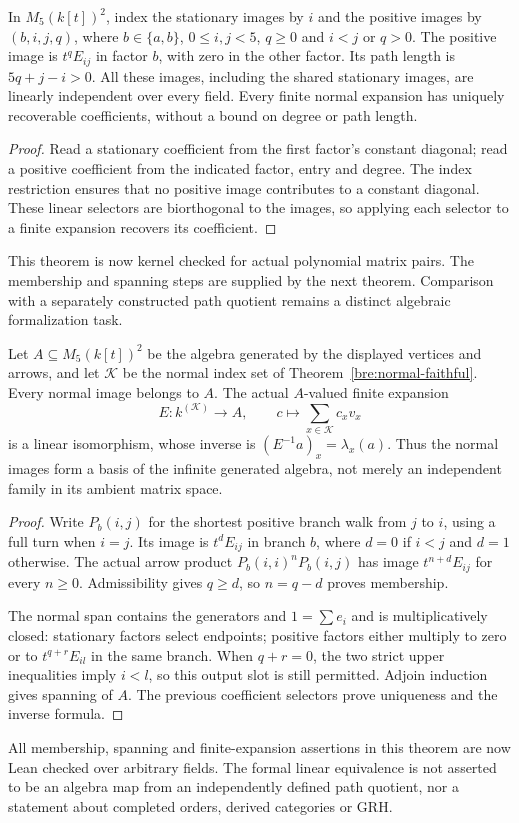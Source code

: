 \begin{theorem}\label{bre:normal-faithful}
In $M_5(k[t])^2$, index the stationary images by $i$ and the positive
images by $(b,i,j,q)$, where $b\in\{a,b\}$, $0\leq i,j<5$, $q\geq0$
and $i<j$ or $q>0$. The positive image is $t^qE_{ij}$ in factor $b$,
with zero in the other factor. Its path length is $5q+j-i>0$.
All these images, including the shared stationary images, are linearly
independent over every field. Every finite normal expansion has uniquely
recoverable coefficients, without a bound on degree or path length.
\end{theorem}
\begin{proof}
Read a stationary coefficient from the first factor's constant diagonal;
read a positive coefficient from the indicated factor, entry and degree.
The index restriction ensures that no positive image contributes to a
constant diagonal. These linear selectors are biorthogonal to the images,
so applying each selector to a finite expansion recovers its coefficient.
\end{proof}
This theorem is now kernel checked for actual polynomial matrix pairs.
The membership and spanning steps are supplied by the next theorem.
Comparison with a separately constructed path quotient remains a distinct
algebraic formalization task.


\begin{theorem}\label{bre:normal-generated}
Let $A\subseteq M_5(k[t])^2$ be the algebra generated by the displayed
vertices and arrows, and let $\mathcal K$ be the normal index set of
Theorem~\ref{bre:normal-faithful}. Every normal image belongs to $A$.
The actual $A$-valued finite expansion
\[
 E:k^{(\mathcal K)}\longrightarrow A,\qquad
 c\longmapsto\sum_{x\in\mathcal K}c_xv_x
\]
is a linear isomorphism, whose inverse is $(E^{-1}a)_x=\lambda_x(a)$.
Thus the normal images form a basis of the infinite generated algebra,
not merely an independent family in its ambient matrix space.
\end{theorem}
\begin{proof}
Write $P_b(i,j)$ for the shortest positive branch walk from $j$ to $i$,
using a full turn when $i=j$. Its image is $t^dE_{ij}$ in branch $b$,
where $d=0$ if $i<j$ and $d=1$ otherwise. The actual arrow product
$P_b(i,i)^nP_b(i,j)$ has image $t^{n+d}E_{ij}$ for every $n\geq0$.
Admissibility gives $q\geq d$, so $n=q-d$ proves membership.

The normal span contains the generators and $1=\sum e_i$ and is
multiplicatively closed: stationary factors select endpoints; positive
factors either multiply to zero or to $t^{q+r}E_{il}$ in the same branch.
When $q+r=0$, the two strict upper inequalities imply $i<l$, so this
output slot is still permitted. Adjoin induction gives spanning of $A$.
The previous coefficient selectors prove uniqueness and the inverse formula.
\end{proof}
All membership, spanning and finite-expansion assertions in this theorem
are now Lean checked over arbitrary fields. The formal linear equivalence
is not asserted to be an algebra map from an independently defined path
quotient, nor a statement about completed orders, derived categories or GRH.

